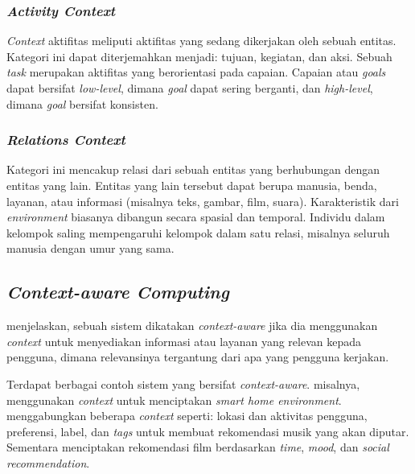 \subsubsection{\textit{Activity Context}}
\label{sssec:activity-context}
\textit{Context} aktifitas meliputi aktifitas yang sedang dikerjakan oleh sebuah entitas. Kategori ini dapat diterjemahkan menjadi: tujuan, kegiatan, dan aksi. Sebuah \textit{task} merupakan aktifitas yang berorientasi pada capaian. Capaian atau \textit{goals} dapat bersifat \textit{low-level}, dimana \textit{goal} dapat sering berganti, dan \textit{high-level}, dimana \textit{goal} bersifat konsisten.


\subsubsection{\textit{Relations Context}}
\label{sssec:relations-context}
Kategori ini mencakup relasi dari sebuah entitas yang berhubungan dengan entitas yang lain. Entitas yang lain tersebut dapat berupa manusia, benda, layanan, atau informasi (misalnya teks, gambar, film, suara). Karakteristik dari \textit{environment} biasanya dibangun secara spasial dan temporal. Individu dalam kelompok saling mempengaruhi kelompok dalam satu relasi, misalnya seluruh manusia dengan umur yang sama.


\subsection{\textit{Context-aware Computing}}
\label{ssec:context-aware-computing}
\citep{dey_understanding_2001} menjelaskan, sebuah sistem dikatakan \textit{context-aware} jika dia menggunakan \textit{context} untuk menyediakan informasi atau layanan yang relevan kepada pengguna, dimana relevansinya tergantung dari apa yang pengguna kerjakan.


Terdapat berbagai contoh sistem yang bersifat \textit{context-aware}. \citep{tsai_context-aware_2016} misalnya, menggunakan \textit{context} untuk menciptakan \textit{smart home environment}. \citep{magara_mplist:_2016} menggabungkan beberapa \textit{context} seperti: lokasi dan aktivitas pengguna, preferensi, label, dan \textit{tags} untuk membuat rekomendasi musik yang akan diputar. Sementara \citep{said_introduction_2013} menciptakan rekomendasi film berdasarkan \textit{time}, \textit{mood}, dan \textit{social recommendation}.


